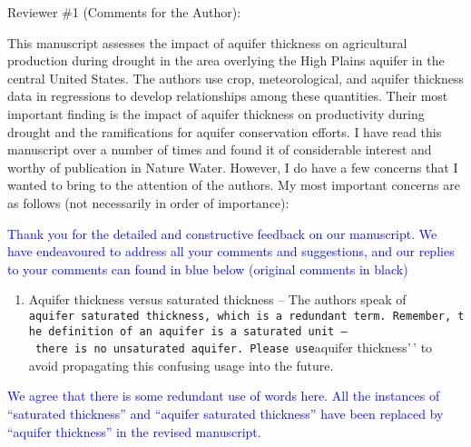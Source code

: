 \documentclass[
]{article}
\author{}
\date{\vspace{-2.5em}}
\providecommand{\tightlist}{%
  \setlength{\itemsep}{0pt}\setlength{\parskip}{0pt}}
\begin{document}
Reviewer \#1 (Comments for the Author):

This manuscript assesses the impact of aquifer thickness on agricultural
production during drought in the area overlying the High Plains aquifer
in the central United States. The authors use crop, meteorological, and
aquifer thickness data in regressions to develop relationships among
these quantities. Their most important finding is the impact of aquifer
thickness on productivity during drought and the ramifications for
aquifer conservation efforts. I have read this manuscript over a number
of times and found it of considerable interest and worthy of publication
in Nature Water. However, I do have a few concerns that I wanted to
bring to the attention of the authors. My most important concerns are as
follows (not necessarily in order of importance):

\textcolor{blue}{Thank you for the detailed and constructive feedback on our manuscript. We have endeavoured to address all your comments and suggestions, and our replies to your comments can found in blue below (original comments in black)}

\begin{enumerate}
\def\labelenumi{\arabic{enumi}.}
\tightlist
\item
  Aquifer thickness versus saturated thickness -- The authors speak of
  \texttt{aquifer\ saturated\ thickness\textquotesingle{}\textquotesingle{},\ which\ is\ a\ redundant\ term.\ Remember,\ the\ definition\ of\ an\ aquifer\ is\ a\ saturated\ unit\ –\ there\ is\ no\ unsaturated\ aquifer.\ Please\ use}aquifer
  thickness'\,' to avoid propagating this confusing usage into the
  future.
\end{enumerate}

\textcolor{blue}{We agree that there is some redundant use of words here. All the instances of ``saturated thickness'' and ``aquifer saturated thickness'' have been replaced by ``aquifer thickness'' in the revised manuscript.}
\end{document}
